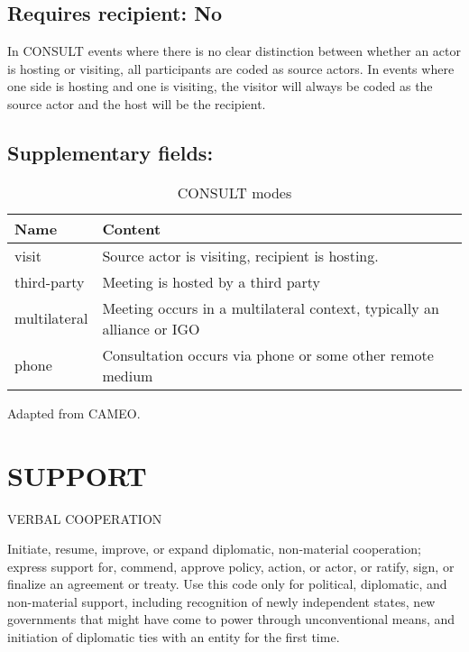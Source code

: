 \documentclass[11pt]{report}
\newcommand{\plcat}[1]{\textsf{#1}}
\begin{document}
\subsection{Requires recipient: No}

In \plcat{CONSULT} events where there is no clear distinction between whether an actor is hosting or visiting, all participants are coded as source actors. In events where one side is hosting and one is visiting, the visitor will always be coded as the source actor and the host will be the recipient.

\subsection{Supplementary fields: }

\begin{table}[htp]
\caption{CONSULT modes}
\begin{center}
\begin{tabular}{|l|p{13cm}|}
\hline
Name & Content \\
\hline
visit & Source actor is visiting, recipient is hosting.\\
third-party & Meeting is hosted by a third party\\
multilateral & Meeting occurs in a multilateral context, typically an alliance or IGO\\
phone & Consultation occurs via phone or some other remote medium\\
\hline
\end{tabular}
\end{center}
\label{tab:consultmode}
Adapted from CAMEO.
\end{table}%


\newpage

\section{SUPPORT}

\textsf{VERBAL COOPERATION} \vspace{8pt}

Initiate, resume, improve, or expand diplomatic, non-material cooperation; express support for, commend, approve policy, action, or actor, or ratify, sign, or finalize an agreement or treaty. Use this code only for political, diplomatic, and non-material support, including recognition of newly independent states, new governments that might have come to power through unconventional means, and initiation of diplomatic ties with an entity for the first time. 
\end{document}
